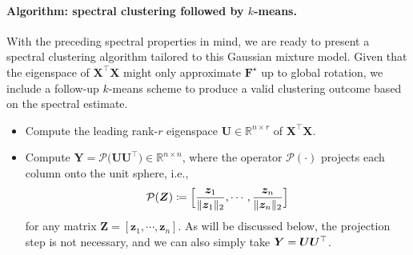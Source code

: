 \paragraph{Algorithm: spectral clustering followed by $k$-means.}

With the preceding spectral properties in mind, we are ready to present a spectral clustering algorithm tailored to this Gaussian mixture model.
Given that the eigenspace of $\bm{X}^{\top}\bm{X}$ might only approximate $\bm{F}^{\star}$ up to global rotation,
we include a follow-up $k$-means scheme \citep{macqueen1967some}
 to produce a valid clustering outcome based on the spectral estimate.
%
\begin{itemize}
	\item[1.] Compute the leading rank-$r$ eigenspace $\bm{U}\in \mathbb{R}^{n\times r}$ of $\bm{X}^{\top}\bm{X}$.

	\item[2.] Compute $\bm{Y}= \mathcal{P} \big( \bm{U}\bm{U}^{\top} \big) \in \mathbb{R}^{n\times n}$,
		where the operator $\mathcal{P}(\cdot)$ projects each column onto the unit sphere,
		i.e., 
\begin{align*}
	\mathcal{P}(\bm{Z}) \coloneqq \Big[ \frac{\bm{z}_{1}}{\|{\boldsymbol z}_1\|_2},\cdots,  \frac{{\boldsymbol z}_n}{\|\bm{z}_{n}\|_2}\Big] 
\end{align*}
	for any matrix $\bm{Z}=[\bm{z}_1,\cdots,\bm{z}_n]$. 
	As will be discussed below, the projection step is not necessary, and we can also simply take ${\boldsymbol Y} = {\boldsymbol U} {\boldsymbol U}^\top$.
	
	
	

\end{itemize}
